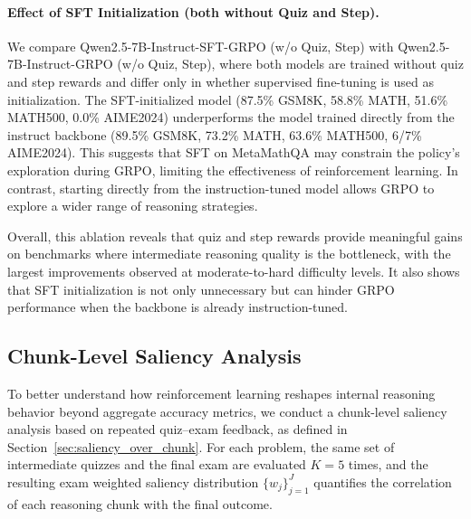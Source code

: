 \documentclass[12pt]{report}
\begin{document}
\paragraph{Effect of SFT Initialization (both without Quiz and Step).} We compare Qwen2.5-7B-Instruct-SFT-GRPO (w/o Quiz, Step) with Qwen2.5-7B-Instruct-GRPO (w/o Quiz, Step), where both models are trained without quiz and step rewards and differ only in whether supervised fine-tuning is used as initialization. The SFT-initialized model (87.5\% GSM8K, 58.8\% MATH, 51.6\% MATH500, 0.0\% AIME2024) underperforms the model trained directly from the instruct backbone (89.5\% GSM8K, 73.2\% MATH, 63.6\% MATH500, 6/7\% AIME2024). This suggests that SFT on MetaMathQA may constrain the policy's exploration during GRPO, limiting the effectiveness of reinforcement learning. In contrast, starting directly from the instruction-tuned model allows GRPO to explore a wider range of reasoning strategies.

Overall, this ablation reveals that quiz and step rewards provide meaningful gains on benchmarks where intermediate reasoning quality is the bottleneck, with the largest improvements observed at moderate-to-hard difficulty levels. It also shows that SFT initialization is not only unnecessary but can hinder GRPO performance when the backbone is already instruction-tuned.



\subsection{Chunk-Level Saliency Analysis}
\label{sec:saliency_chunks}

To better understand how reinforcement learning reshapes internal reasoning
behavior beyond aggregate accuracy metrics, we conduct a chunk-level saliency
analysis based on repeated quiz--exam feedback, as defined in
Section~\ref{sec:saliency_over_chunk}.  For each problem, the same set of intermediate quizzes and the
final exam are evaluated $K=5$ times, and the resulting exam weighted saliency
distribution $\{w_j\}_{j=1}^{J}$ quantifies the correlation of each reasoning
chunk with the final outcome.
\end{document}
